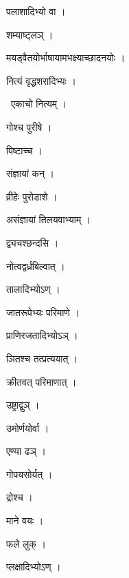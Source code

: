 \documentclass[10pt, openany, oneside]{book}
\begin{document}
\noindent पलाशादिभ्यो वा ।

\noindent शम्याष्ट्लञ् ।

\noindent मयड्वैतयोर्भाषायामभक्ष्याच्छादनयोः ।

\noindent नित्यं वृद्धशरादिभ्यः ।

\par\noindent\hspace{1.5em}{\vps वा॰}~{\qt एकाचो नित्यम् ।}

\noindent गोश्च पुरीषे ।

\noindent पिष्टाच्च ।

\noindent संज्ञायां कन् ।

\noindent व्रीहेः पुरोडाशे ।

\noindent असंज्ञायां तिलयवाभ्याम् ।

\noindent द्व्यचश्छन्दसि ।

\noindent नोत्वद्वर्ध्रबिल्वात् ।

\noindent तालादिभ्योऽण् ।

\noindent जातरूपेभ्यः परिमाणे ।

\noindent प्राणिरजतादिभ्योऽञ् ।

\noindent ञितश्च तत्प्रत्ययात् ।

\noindent क्रीतवत् परिमाणात् ।

\noindent उष्ट्राद्वुञ् ।

\noindent उमोर्णयोर्वा ।

\noindent एण्या ढञ् ।

\noindent गोपयसोर्यत् ।

\noindent द्रोश्च ।

\noindent माने वयः ।

\noindent फले लुक् ।

\noindent प्लक्षादिभ्योऽण् ।
\end{document}
